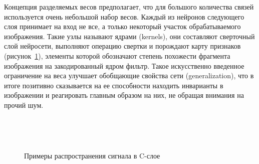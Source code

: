 \documentclass[a4paper,14pt]{extarticle} %
\begin{document}
Концепция разделяемых весов предполагает, что для большого количества связей используется очень небольшой набор весов. Каждый из нейронов следующего слоя принимает на вход не все, а только некоторый участок обрабатываемого изображения. Такие узлы называют ядрами (kernels), они составляют сверточный слой нейросети, выполняют операцию свертки и порождают карту признаков (рисунок~\ref{fig:priznaki}), элементы которой обозначают степень похожести фрагмента изображения на закодированный ядром фильтр. Такое искусственно введенное ограничение на веса улучшает обобщающие свойства сети (generalization), что в итоге позитивно сказывается на ее способности находить инварианты в изображении и реагировать главным образом на них, не обращая внимания на прочий шум.

\begin{figure}[H]
	\begin{minipage}[h]{1\linewidth}
		 \\
	\end{minipage}
	\vfill
	\begin{minipage}[h]{1\linewidth}
		 \\
	\end{minipage}
	\caption{Примеры распространения сигнала в C-слое}
	\label{fig:priznaki}
\end{figure}

\end{document}
